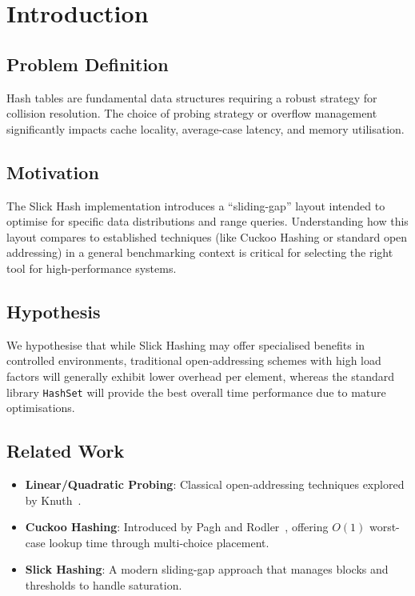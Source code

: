 \documentclass[11pt,a4paper]{article}
\begin{document}
\section{Introduction}

\subsection{Problem Definition}

Hash tables are fundamental data structures requiring a robust strategy for collision resolution. The choice of probing strategy or overflow management significantly impacts cache locality, average-case latency, and memory utilisation.

\subsection{Motivation}

The Slick Hash implementation introduces a ``sliding-gap'' layout intended to optimise for specific data distributions and range queries. Understanding how this layout compares to established techniques (like Cuckoo Hashing or standard open addressing) in a general benchmarking context is critical for selecting the right tool for high-performance systems.

\subsection{Hypothesis}

We hypothesise that while Slick Hashing may offer specialised benefits in controlled environments, traditional open-addressing schemes with high load factors will generally exhibit lower overhead per element, whereas the standard library \texttt{HashSet} will provide the best overall time performance due to mature optimisations.

\subsection{Related Work}

\begin{itemize}
  \item \textbf{Linear/Quadratic Probing}: Classical open-addressing techniques explored by Knuth~\cite{knuth1998}.
  \item \textbf{Cuckoo Hashing}: Introduced by Pagh and Rodler~\cite{pagh2001}, offering $O(1)$ worst-case lookup time through multi-choice placement.
  \item \textbf{Slick Hashing}: A modern sliding-gap approach that manages blocks and thresholds to handle saturation.
\end{itemize}
\end{document}
